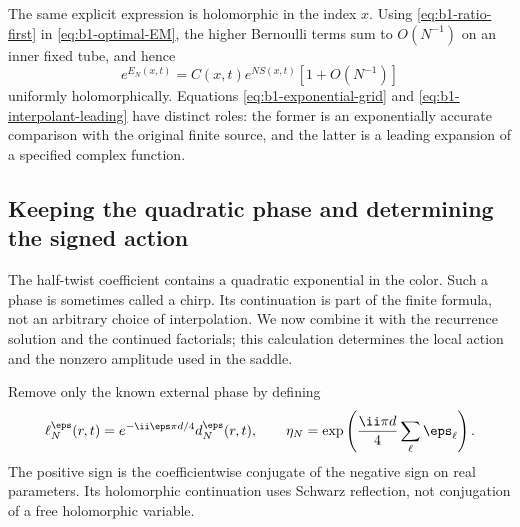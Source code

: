 The same explicit expression is holomorphic in the index $x$.
Using \eqref{eq:b1-ratio-first} in
\eqref{eq:b1-optimal-EM}, the higher Bernoulli terms sum to $O(N^{-1})$
on an inner fixed tube, and hence
\begin{equation}\label{eq:b1-interpolant-leading}
 e^{E_N(x,t)}=C(x,t)e^{NS(x,t)}[1+O(N^{-1})]
\end{equation}
uniformly holomorphically. Equations
\eqref{eq:b1-exponential-grid} and
\eqref{eq:b1-interpolant-leading} have distinct roles: the former is
an exponentially accurate comparison with the original finite source,
and the latter is a leading expansion of a specified complex function.

\subsection{Keeping the quadratic phase and determining the signed action}

The half-twist coefficient contains a quadratic exponential in the color. Such a phase is sometimes called a chirp. Its continuation is part of the finite formula, not an arbitrary choice of interpolation. We now combine it with the recurrence solution and the continued factorials; this calculation determines the local action and the nonzero amplitude used in the saddle.

Remove only the known external phase by defining
\[
 \ell_N^\eps(r,t)=e^{-\ii\eps\pi d/4}d_N^\eps(r,t),
 \qquad \eta_N=\exp\left(\frac{\ii\pi d}4
                               \sum_{\ell}\eps_\ell\right).
\]
The positive sign is the coefficientwise conjugate of the negative sign
on real parameters. Its holomorphic continuation uses Schwarz
reflection, not conjugation of a free holomorphic variable.


